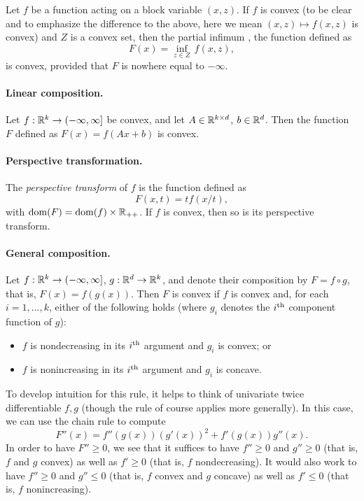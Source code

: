 Let $f$ be a function acting on a block variable $(x,z)$. If $f$ is convex (to
be clear and to emphasize the difference to the above, here we mean $(x,z)
\mapsto f(x,z)$ is convex) and $Z$ is a convex set, then the partial infimum
, the function defined as  
\[
F(x) = \inf_{z \in Z} \, f(x,z),
\]
is convex, provided that $F$ is nowhere equal to $-\infty$. 

\paragraph{Linear composition.} 

Let $f : \mathbb{R}^k \to (-\infty, \infty]$ be convex, and let $A \in \mathbb{R}^{k \times d}$,
$b \in \mathbb{R}^d$. Then the function $F$ defined as $F(x) = f(Ax+b)$ is convex.     

\paragraph{Perspective transformation.} 

The \emph{perspective transform} of $f$ is the function defined as
\[
F(x,t) = t f(x/t),
\]
with $\operatorname{dom}(F) = \operatorname{dom}(f) \times \mathbb{R}_{++}$. If $f$ is convex, then so is its
perspective transform. 

\paragraph{General composition.} 

Let $f : \mathbb{R}^k \to (-\infty, \infty]$, $g : \mathbb{R}^d \to \mathbb{R}^k$, and denote their
composition by $F = f \circ g$, that is, $F(x) = f(g(x))$. Then $F$ is convex if
$f$ is convex and, for each $i=1,\ldots,k$, either of the following holds (where
$g_i$ denotes the $i^{\textnormal{th}}$ component function of $g$): 
\begin{itemize}
\item $f$ is nondecreasing in its $i^{\textnormal{th}}$ argument and $g_i$ is convex; or
\item $f$ is nonincreasing in its $i^{\textnormal{th}}$ argument and $g_i$ is concave.
\end{itemize} 

To develop intuition for this rule, it helps to think of univariate twice
differentiable $f,g$ (though the rule of course applies more generally). In this
case, we can use the chain rule to compute
\[
F''(x) = f''(g(x)) (g'(x))^2 + f'(g(x)) g''(x).
\]
In order to have $F'' \geq 0$, we see that it suffices to have $f'' \geq 0$ and
$g'' \geq 0$ (that is, $f$ and $g$ convex) as well as $f' \geq 0$ (that is, $f$
nondecreasing). It would also work to have $f'' \geq 0$ and $g'' \leq 0$ (that
is, $f$ convex and $g$ concave) as well as $f' \leq 0$ (that is, $f$
nonincreasing).

